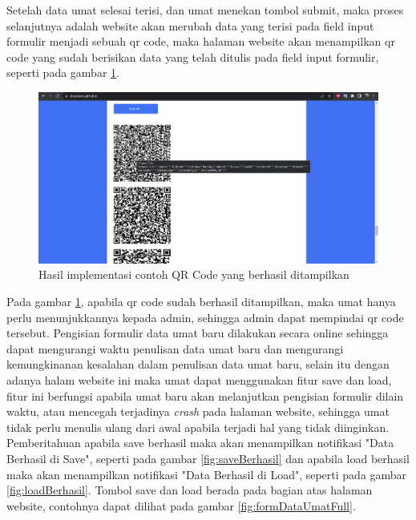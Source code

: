 Setelah data umat selesai terisi, dan umat menekan tombol submit, maka proses selanjutnya adalah website akan merubah data yang terisi pada field input formulir menjadi sebuah qr code, maka halaman website akan menampilkan qr code yang sudah berisikan data yang telah ditulis pada field input formulir, seperti pada gambar \ref{fig:contohQRCodeSubmit}.

\begin{figure}[H]
	\centering
	\includegraphics[scale=0.4]{Gambar/contohQRCodeSubmit.png}
	\caption{Hasil implementasi contoh QR Code yang berhasil ditampilkan} 
	\label{fig:contohQRCodeSubmit}
\end{figure}

Pada gambar \ref{fig:contohQRCodeSubmit}, apabila qr code sudah berhasil ditampilkan, maka umat hanya perlu menunjukkannya kepada admin, sehingga admin dapat mempindai qr code tersebut. Pengisian formulir data umat baru dilakukan secara online sehingga dapat mengurangi waktu penulisan data umat baru dan mengurangi kemungkinanan kesalahan dalam penulisan data umat baru, selain itu dengan adanya halam website ini maka umat dapat menggunakan fitur save dan load, fitur ini berfungsi apabila umat baru akan melanjutkan pengisian formulir dilain waktu, atau mencegah terjadinya \textit{crash} pada halaman website, sehingga umat tidak perlu menulis ulang dari awal apabila terjadi hal yang tidak diinginkan. Pemberitahuan apabila save berhasil maka akan menampilkan notifikasi "Data Berhasil di Save", seperti pada gambar \ref{fig:saveBerhasil} dan apabila load berhasil maka akan menampilkan notifikasi "Data Berhasil di Load", seperti pada gambar \ref{fig:loadBerhasil}. Tombol save dan load berada pada bagian atas halaman website, contohnya dapat dilihat pada gambar \ref{fig:formDataUmatFull}.

